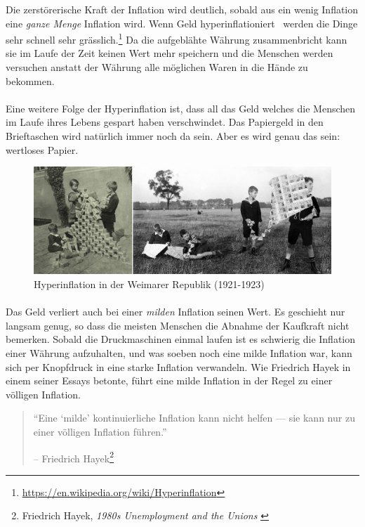 Die zerstörerische Kraft der Inflation wird deutlich, sobald aus ein wenig
Inflation eine \textit{ganze Menge} Inflation wird. Wenn Geld
hyperinflationiert~\cite{wiki:hyperinflation} werden die Dinge sehr schnell sehr
grässlich.\footnote{\url{https://en.wikipedia.org/wiki/Hyperinflation}} Da die
aufgeblähte Währung zusammenbricht kann sie im Laufe der Zeit keinen Wert mehr
speichern und die Menschen werden versuchen anstatt der Währung alle
möglichen Waren in die Hände zu bekommen.

\paragraph{}
Eine weitere Folge der Hyperinflation ist, dass all das Geld welches die
Menschen im Laufe ihres Lebens gespart haben verschwindet. Das Papiergeld in den
Brieftaschen wird natürlich immer noch da sein. Aber es wird genau das sein:
wertloses Papier.

\begin{figure}
  \includegraphics[width=\textwidth]{assets/images/children-playing-with-money.png}
  \caption{Hyperinflation in der Weimarer Republik (1921-1923)}
  \label{fig:children-playing-with-money}
\end{figure}

\paragraph{}
Das Geld verliert auch bei einer \textit{milden} Inflation seinen Wert. Es
geschieht nur langsam genug, so dass die meisten Menschen die Abnahme der
Kaufkraft nicht bemerken. Sobald die Druckmaschinen einmal laufen ist es
schwierig die Inflation einer Währung aufzuhalten, und was soeben noch eine
milde Inflation war, kann sich per Knopfdruck in eine starke Inflation
verwandeln. Wie Friedrich Hayek in einem seiner Essays betonte, führt eine milde
Inflation in der Regel zu einer völligen Inflation.

\begin{quotation}\begin{samepage}
\enquote{Eine \enquote{milde} kontinuierliche Inflation kann nicht helfen — sie
kann nur zu einer völligen Inflation führen.}
\begin{flushright} -- Friedrich Hayek\footnote{Friedrich Hayek, \textit{1980s
Unemployment and the Unions} \cite{hayek-inflation}}
\end{flushright}\end{samepage}\end{quotation}

